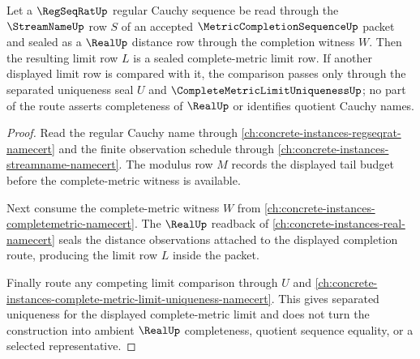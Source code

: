 \begin{theorem}
\label{thm:metric-completion-sequence-regular-cauchy-seal}
Let a $\RegSeqRatUp$ regular Cauchy sequence be read through the $\StreamNameUp$ row $S$ of an accepted $\MetricCompletionSequenceUp$ packet and sealed as a $\RealUp$ distance row through the completion witness $W$. Then the resulting limit row $L$ is a sealed complete-metric limit row. If another displayed limit row is compared with it, the comparison passes only through the separated uniqueness seal $U$ and $\CompleteMetricLimitUniquenessUp$; no part of the route asserts completeness of $\RealUp$ or identifies quotient Cauchy names.
\end{theorem}
\begin{proof}
Read the regular Cauchy name through \autoref{ch:concrete-instances-regseqrat-namecert} and the finite observation schedule through \autoref{ch:concrete-instances-streamname-namecert}. The modulus row $M$ records the displayed tail budget before the complete-metric witness is available.

Next consume the complete-metric witness $W$ from \autoref{ch:concrete-instances-completemetric-namecert}. The $\RealUp$ readback of \autoref{ch:concrete-instances-real-namecert} seals the distance observations attached to the displayed completion route, producing the limit row $L$ inside the packet.

Finally route any competing limit comparison through $U$ and \autoref{ch:concrete-instances-complete-metric-limit-uniqueness-namecert}. This gives separated uniqueness for the displayed complete-metric limit and does not turn the construction into ambient $\RealUp$ completeness, quotient sequence equality, or a selected representative.
\end{proof}


\begin{closurestatus}{\MetricCompletionSequenceUp}
  \theoryclosure{\seedClosure}
  \formalstatus{\formalTargetV}
\end{closurestatus}
